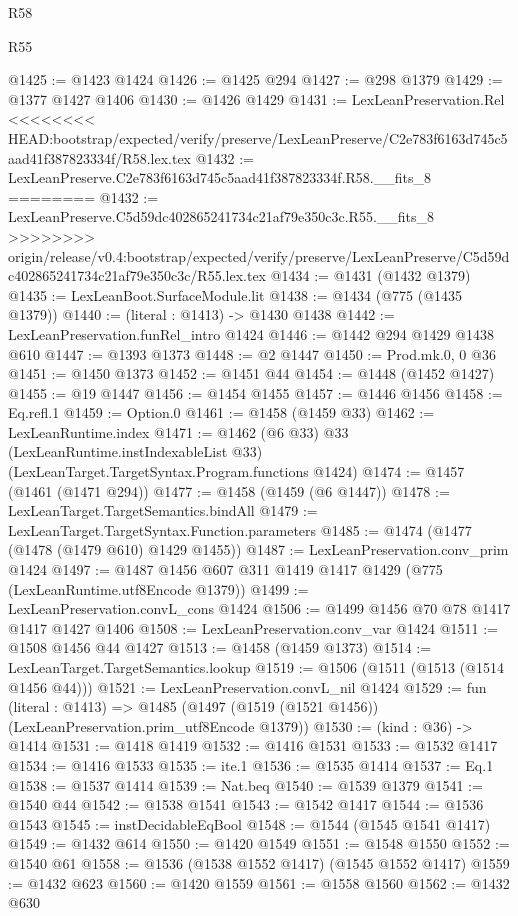 \begin{lexlean}{R58}
\begin{lexlean}{R55}
\begin{coremodule}
{{{{{{{{{{{{{{{{{{{{{{{{{{{{{{{{{{{{{{{{{{{{{{{{{{{{{{{{{{{{{{@1425 := @1423 @1424
@1426 := @1425 @294
@1427 := @298 @1379
@1429 := @1377 @1427 @1406
@1430 := @1426 @1429
@1431 := LexLeanPreservation.Rel
<<<<<<<< HEAD:bootstrap/expected/verify/preserve/LexLeanPreserve/C2e783f6163d745c5aad41f387823334f/R58.lex.tex
@1432 := LexLeanPreserve.C2e783f6163d745c5aad41f387823334f.R58.__fits_8
========
@1432 := LexLeanPreserve.C5d59dc402865241734c21af79e350c3c.R55.__fits_8
>>>>>>>> origin/release/v0.4:bootstrap/expected/verify/preserve/LexLeanPreserve/C5d59dc402865241734c21af79e350c3c/R55.lex.tex
@1434 := @1431 (@1432 @1379)
@1435 := LexLeanBoot.SurfaceModule.lit
@1438 := @1434 (@775 (@1435 @1379))
@1440 := (literal : @1413) -> @1430 @1438
@1442 := LexLeanPreservation.funRel_intro @1424
@1446 := @1442 @294 @1429 @1438 @610
@1447 := @1393 @1373
@1448 := @2 @1447
@1450 := Prod.mk.{0, 0} @36
@1451 := @1450 @1373
@1452 := @1451 @44
@1454 := @1448 (@1452 @1427)
@1455 := @19 @1447
@1456 := @1454 @1455
@1457 := @1446 @1456
@1458 := Eq.refl.{1}
@1459 := Option.{0}
@1461 := @1458 (@1459 @33)
@1462 := LexLeanRuntime.index
@1471 := @1462
    (@6 @33)
    @33
    (LexLeanRuntime.instIndexableList @33)
    (LexLeanTarget.TargetSyntax.Program.functions @1424)
@1474 := @1457 (@1461 (@1471 @294))
@1477 := @1458 (@1459 (@6 @1447))
@1478 := LexLeanTarget.TargetSemantics.bindAll
@1479 := LexLeanTarget.TargetSyntax.Function.parameters
@1485 := @1474 (@1477 (@1478 (@1479 @610) @1429 @1455))
@1487 := LexLeanPreservation.conv_prim @1424
@1497 := @1487 @1456 @607 @311 @1419 @1417 @1429 (@775 (LexLeanRuntime.utf8Encode @1379))
@1499 := LexLeanPreservation.convL_cons @1424
@1506 := @1499 @1456 @70 @78 @1417 @1417 @1427 @1406
@1508 := LexLeanPreservation.conv_var @1424
@1511 := @1508 @1456 @44 @1427
@1513 := @1458 (@1459 @1373)
@1514 := LexLeanTarget.TargetSemantics.lookup
@1519 := @1506 (@1511 (@1513 (@1514 @1456 @44)))
@1521 := LexLeanPreservation.convL_nil @1424
@1529 := fun (literal : @1413) =>
  @1485 (@1497 (@1519 (@1521 @1456)) (LexLeanPreservation.prim_utf8Encode @1379))
@1530 := (kind : @36) -> @1414
@1531 := @1418 @1419
@1532 := @1416 @1531
@1533 := @1532 @1417
@1534 := @1416 @1533
@1535 := ite.{1}
@1536 := @1535 @1414
@1537 := Eq.{1}
@1538 := @1537 @1414
@1539 := Nat.beq
@1540 := @1539 @1379
@1541 := @1540 @44
@1542 := @1538 @1541
@1543 := @1542 @1417
@1544 := @1536 @1543
@1545 := instDecidableEqBool
@1548 := @1544 (@1545 @1541 @1417)
@1549 := @1432 @614
@1550 := @1420 @1549
@1551 := @1548 @1550
@1552 := @1540 @61
@1558 := @1536 (@1538 @1552 @1417) (@1545 @1552 @1417)
@1559 := @1432 @623
@1560 := @1420 @1559
@1561 := @1558 @1560
@1562 := @1432 @630
}}}}}}}}}}}}}}}}}}}}}}}}}}}}}}}}}}}}}}}}}}}}}}}}}}}}}}}}}}}}}}
\end{coremodule}
\end{lexlean}
\end{lexlean}
